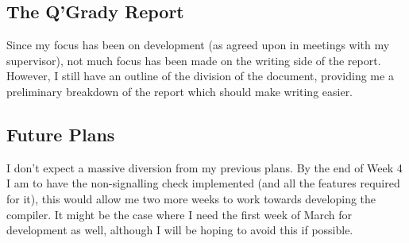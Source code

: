\documentclass[report.tex]{subfiles}
\begin{document}
\subsection{The Q'Grady Report} %
\label{sub:the_q_grady_report}
Since my focus has been on development (as agreed upon in meetings with my
supervisor), not much focus has been made on the writing side of the report.
However, I still have an outline of the division of the document, providing me
a preliminary breakdown of the report which should make writing easier.
\subsection{Future Plans} %
\label{sub:future_plans}
I don't expect a massive diversion from my previous plans. By the end of Week 4
I am to have the non-signalling check implemented (and all the features required
for it), this would allow me two more weeks to work towards developing the
compiler. It might be the case where I need the first week of March for
development as well, although I will be hoping to avoid this if possible.
\newpage
\end{document}
